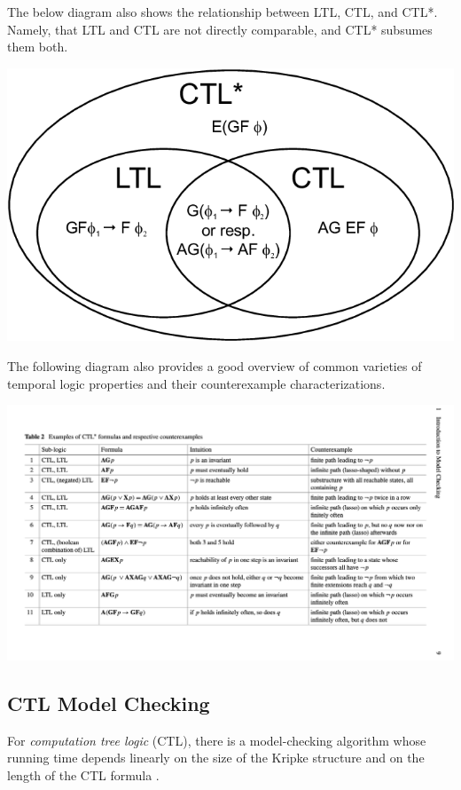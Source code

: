 \documentclass[10pt,a4paper]{article}
\begin{document}
The below diagram also shows the relationship between LTL, CTL, and CTL*. Namely, that LTL and CTL are not directly comparable, and CTL* subsumes them both.
\begin{center}
    \includegraphics[scale=0.2]{images/Expressive-Power-of-LTL-CTL-and-CTL.png}   
\end{center}
The following diagram \cite{Clarke2018ch1} also provides a good overview of common varieties of temporal logic properties and their counterexample characterizations.
\begin{center}
    \includegraphics[scale=0.18]{images/common_ctl_ltl_formulas.png}
\end{center}

\subsection*{CTL Model Checking}

For \textit{computation tree logic} (CTL), there is a model-checking algorithm whose running time depends linearly on the size of the Kripke structure and on the length of the CTL formula \cite{1986clarkeemerson}.
\end{document}
